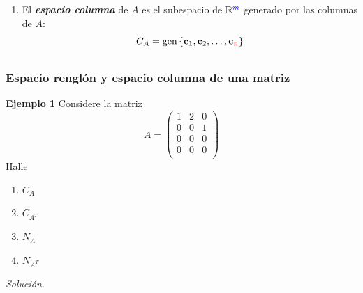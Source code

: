 {\begin{frame}
\begin{defi}{}
\begin{enumerate}
			\smallskip
			\item[\labelname{$b$}] El \textbf{\textit{espacio columna}} de $A$ es el subespacio de $\mathbb{R}^{\color{blue}m}$ generado por las columnas de $A$:
			\[
			C_A = \text{gen}\, \{ \mathbf{c}_1, \mathbf{c}_2, \hdots,\mathbf{c}_{\color{red}n} \}
			\]
		\end{enumerate}
	\end{defi}	
	
\end{frame}
}

\subsection{}

\begin{frame}\frametitle{Espacio renglón y espacio columna de una matriz}
		
	\begin{ej}{\textbf{Ejemplo 1}}
		Considere la matriz
		\[
		A = 
		\left(
		\begin{array}{ccc}
		1 & 2 & 0 \\[1mm]
		0 & 0 & 1\\[1mm]
		0 & 0 & 0\\[1mm]
		0 & 0 & 0\\[1mm]
		\end{array}
		\right)
		\]
		Halle
		
		\vspace{-2mm}
		\begin{multicols}{4}
			\begin{enumerate}\justifying
				\item[\labelname{$a$}] $C_A$
				\item[\labelname{$b$}] $C_{A^T}$
				\item[\labelname{$d$}] $N_A$
				\item[\labelname{$d$}] $N_{A^T}$
			\end{enumerate}
		\end{multicols}		
	
		\vspace{-3mm}	
	\end{ej}
	\textit{Solución}.
	
\end{frame}


